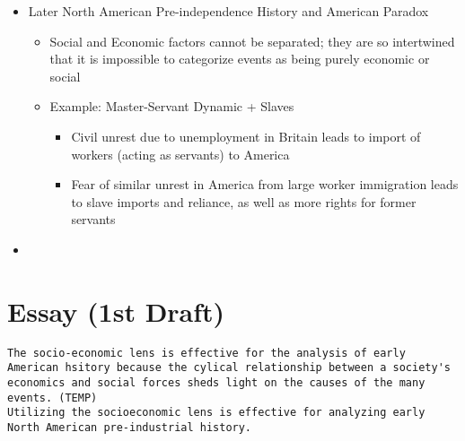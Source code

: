\documentclass[letterpaper]{article}
\begin{document}
\begin{itemize}
\item Later North American Pre-independence History and American Paradox

\begin{itemize}
\item Social and Economic factors cannot be separated; they are so
intertwined that it is impossible to categorize events as being
purely economic or social
\item Example: Master-Servant Dynamic + Slaves

\begin{itemize}
\item Civil unrest due to unemployment in Britain leads to import of
workers (acting as servants) to America
\item Fear of similar unrest in America from large worker immigration
leads to slave imports and reliance, as well as more rights for
former servants
\end{itemize}
\end{itemize}

\item 
\end{itemize}

\section{Essay (1st Draft)}
\label{sec:org188363d}
\begin{verbatim}
The socio-economic lens is effective for the analysis of early American hsitory because the cylical relationship between a society's economics and social forces sheds light on the causes of the many events. (TEMP)
Utilizing the socioeconomic lens is effective for analyzing early North American pre-industrial history.
\end{verbatim}
\end{document}
